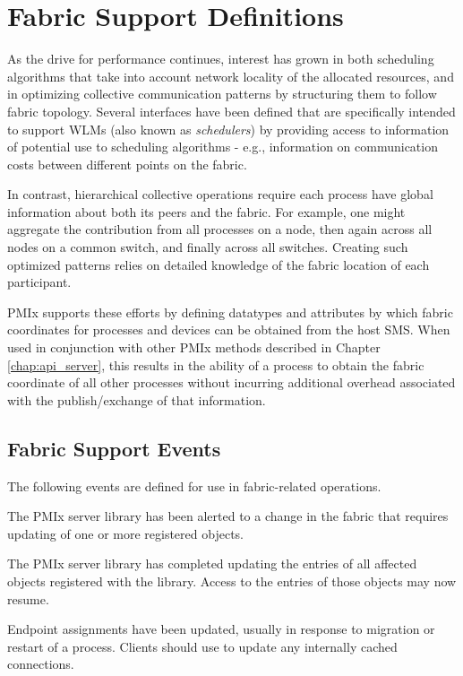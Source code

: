 \chapter{Fabric Support Definitions}
\label{chap:api_fabric}

As the drive for performance continues, interest has grown in both scheduling algorithms that take into account network locality of the allocated resources, and in optimizing collective communication patterns by structuring them to follow fabric topology. Several interfaces have been defined that are specifically intended to support \acp{WLM} (also known as \emph{schedulers}) by providing access to information of potential use to scheduling algorithms - e.g., information on communication costs between different points on the fabric.

In contrast, hierarchical collective operations require each process have global information about both its peers and the fabric. For example, one might aggregate the contribution from all processes on a node, then again across all nodes on a common switch, and finally across all switches. Creating such optimized patterns relies on detailed knowledge of the fabric location of each participant.

\ac{PMIx} supports these efforts by defining datatypes and attributes by which fabric coordinates for processes and devices can be obtained from the host \ac{SMS}. When used in conjunction with other \ac{PMIx} methods described in Chapter \ref{chap:api_server}, this results in the ability of a process to obtain the fabric coordinate of all other processes without incurring additional overhead associated with the publish/exchange of that information.



\section{Fabric Support Events}
\label{api:sched:consts}

The following events are defined for use in fabric-related operations.

\begin{constantdesc}

%
The \ac{PMIx} server library has been alerted to a change in the fabric that requires updating of one or more registered  objects.

%
The \ac{PMIx} server library has completed updating the entries of all affected  objects registered with the library. Access to the entries of those objects may now resume.

%
Endpoint assignments have been updated, usually in response to migration
or restart of a process. Clients should use  to update any
internally cached connections.

\end{constantdesc}

